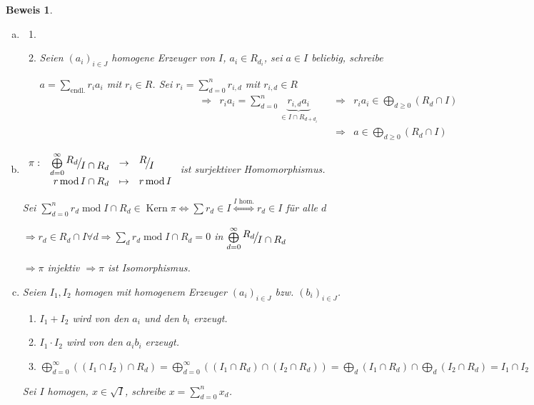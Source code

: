 \documentclass[a4paper, 12pt, numbers=noendperiod, chapterprefix=true]{scrbook}
\theoremstyle{break}
\theoremstyle{nonumberbreak}
\newtheorem{Bew}{Beweis}
\theoremstyle{nonumberplain}
\newcommand{\quot}[1]{\textrm{\glqq}{#1}\textrm{\grqq}}
\newcommand{\Sum}{\sum\limits}
\newenvironment{twosidedproof}{\begin{enumerate}[\quot{$\Rightarrow$}:]}{\end{enumerate}}
\newcommand{\proofforward}{\item[\quot{$\Rightarrow$}:]}
\newcommand{\proofreverse}{\item[\quot{$\Leftarrow$}:]}
\DeclareMathOperator{\Kern}{Kern}
\DeclareMathOperator{\modmodulo}{mod}%
\newcommand{\FakRaum}[2]{
  \raisebox{0.7ex}{\ensuremath{#1}}
  \ensuremath{\mkern-3mu}\big/\ensuremath{\mkern-3mu}
  \raisebox{-0.6ex}{\ensuremath{#2}}}
\begin{document}
\begin{Bew}\begin{enumerate}[a)]
\item[e)]\begin{twosidedproof}
\proofreverse\checkmark

\proofforward
	Seien $(a_i)_{i\in J}$ homogene Erzeuger von $I$, $a_i\in R_{d_i}$, sei $a\in I$ beliebig, schreibe
	
	$a = \Sum_{\text{endl.}}r_ia_i$ mit $r_i\in R$.	Sei $r_i=\Sum_{d=0}^n r_{i,d}$ mit $r_{i,d}\in R$%
		\[\begin{array}{lrrr}\Rightarrow &
		r_ia_i=\sum_{d=0}^n \underbrace{r_{i,d}a_i}_{\in I\cap R_{d+d_i}} & \quad\Rightarrow & r_ia_i\in \bigoplus\limits_{d\ge0}(R_d\cap I)\\
		&& \quad \Rightarrow & a\in \bigoplus\limits_{d\ge0}(R_d\cap I)
		\end{array}\]
\end{twosidedproof}

\item[f)]
	$\begin{array}{crcl}
		\pi:&\bigoplus\limits_{d=0}^{\infty}\FakRaum{R_d}{I\cap R_d} &\to& \FakRaum{R}{I}\\
		&r\modmodulo I\cap R_d &\mapsto& r\modmodulo I
	\end{array}$ ist surjektiver Homomorphismus.
	
	Sei $\Sum_{d=0}^n r_d\modmodulo I\cap R_d\in \Kern{\pi} \Leftrightarrow \sum r_d\in I \overset{I\text{ hom.}}{\Longleftrightarrow} r_d\in I$ f\"ur alle $d$
	
	$\Rightarrow r_d\in R_d\cap I \forall d\Rightarrow \Sum_d r_d\modmodulo I\cap R_d=0$ in $\bigoplus\limits_{d=0}^{\infty}\FakRaum{R_d}{I\cap R_d}$
	
	$\Rightarrow \pi$ injektiv $\Rightarrow \pi$ ist Isomorphismus.
\item[g)]
	Seien $I_1,I_2$ homogen mit homogenem Erzeuger $(a_i)_{i\in J}$ bzw. $(b_i)_{i\in J}$.
	\begin{enumerate}[$\bullet$]
	\item
		$I_1+I_2$ wird von den $a_i$ und den $b_i$ erzeugt.
	\item
		$I_1\cdot I_2$ wird von den $a_ib_i$ erzeugt.
	\item
		$\bigoplus\limits_{d=0}^{\infty}((I_1\cap I_2)\cap R_d)=\bigoplus\limits_{d=0}^{\infty}((I_1\cap R_d)\cap (I_2\cap R_d)) = \bigoplus\limits_d(I_1\cap R_d)\cap \bigoplus\limits_d(I_2\cap R_d)=I_1\cap I_2$
	\end{enumerate}
	Sei $I$ homogen, $x\in \sqrt{I}$, schreibe $x=\Sum_{d=0}^n x_d$.
	

\end{enumerate}
\end{Bew}
\end{document}
